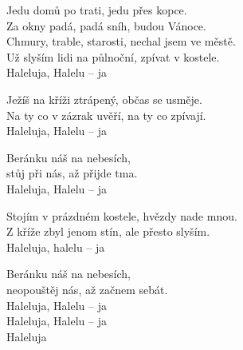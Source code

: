 
\ve{}
Jedu domů po trati, jedu přes kopce.\\
Za okny padá, padá sníh, budou Vánoce.\\
Chmury, trable, starosti, nechal jsem ve městě.\\
Už slyším lidi na půlnoční, zpívat v kostele.\\
Haleluja, Halelu -- ja 

\ve{}
Ježíš na kříži ztrápený, občas se usměje.\\
Na ty co v zázrak uvěří, na ty co zpívají.\\
Haleluja, Halelu -- ja

\cho{}
Beránku náš na nebesích,\\
stůj při nás, až přijde tma.\\
Haleluja, Halelu -- ja

\ve{}
Stojím v prázdném kostele, hvězdy nade mnou.\\
Z kříže zbyl jenom stín, ale přesto slyším.\\
Haleluja, halelu -- ja

\cho{}
\cho{}
Beránku náš na nebesích, \\
neopouštěj nás, až začnem sebát.\\
Haleluja, Halelu -- ja \\
Haleluja, Halelu -- ja \\
Haleluja

\esong{}


